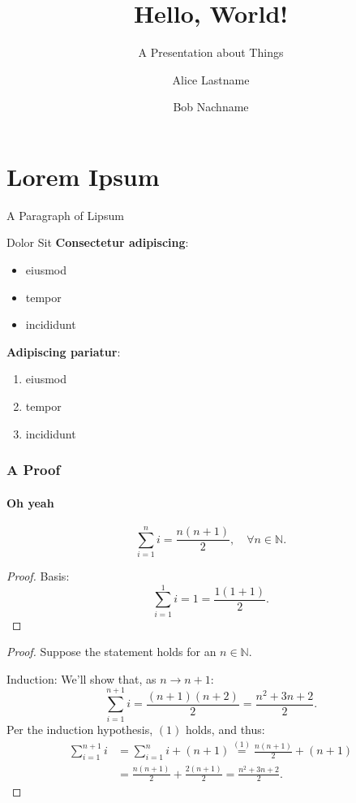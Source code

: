 \documentclass[notheorems]{beamer}
\title{Hello, World!}
\subtitle{A Presentation about Things}
\author{Alice Lastname\inst{1} \and Bob Nachname\inst{2}}
\begin{document}
\maketitle

\section{Lorem Ipsum}

\begin{frame}{A Paragraph of Lipsum}
  \lipsum[1]
\end{frame}

\begin{frame}{Dolor Sit}
\textbf{Consectetur adipiscing}:
  \begin{itemize}
    \item eiusmod
    \item tempor
    \item incididunt
  \end{itemize}

\textbf{Adipiscing pariatur}:
  \begin{enumerate}
    \item eiusmod
    \item tempor
    \item incididunt
  \end{enumerate}
\end{frame}


\begin{frame}
  \frametitle{A Proof}
  \framesubtitle{Oh yeah}
  \begin{thm}
    \begin{equation*}
      \sum_{i=1}^n i = \frac{n(n+1)}{2},%
      \quad\forall n\in\mathbb{N}.
    \end{equation*}
  \end{thm}
  \begin{proof}\noqed
    Basis:
    \begin{equation*}
      \sum_{i=1}^1 i = 1 = \frac{1(1+1)}{2}.
    \end{equation*}
  \end{proof}
\end{frame}
\begin{frame}
  \begin{proof}
    Suppose the statement holds for an
    $n\in\mathbb{N}$.

    Induction:
    We'll show that, as $n\longrightarrow n+1$:
    \begin{equation*}
      \sum_{i=1}^{n+1} i = \frac{(n+1)(n+2)}{2}
      = \frac{n^2 + 3n + 2}{2}.
    \end{equation*}
    Per the induction hypothesis, $(1)$ holds, and thus:
    \begin{align*}
      \sum_{i=1}^{n+1} i
      &= \sum_{i=1}^{n} i + (n+1)
      \overset{(1)}{=} \frac{n(n+1)}{2} + (n+1) \\
      &= \frac{n(n+1)}{2} + \frac{2(n+1)}{2}
      = \frac{n^2 + 3n + 2}{2}.
    \end{align*}
  \end{proof}
\end{frame}

\end{document}
